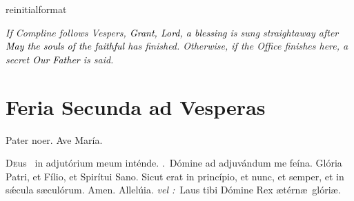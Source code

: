 \documentclass[12pt]{article} %
\newcommand{\myaboveinitial}[1]{%
    \expandafter\renewcommand\csname greinitialformat\endcsname[1]{%
        \fontsize{43}{43}\selectfont ##1
    }
    \gresetfirstlineaboveinitial{\textcolor{benred8}{\raisebox{6.0mm}{\small \textsc{\textbf{#1}}}}}{}
}
\newenvironment{rubric}{\vspace{2 mm}\color{benred8} \itshape \leftskip 0in \setlength{\parindent}{0.25in}}{\vspace{2 mm}}
\newenvironment{response}{\leftskip 0in \setlength{\parindent}{0in}}{\vspace{2 mm}}
\def\vel{\textit{\textcolor{benred8}{vel :}}}
\let\oldVbar\Vbar
\renewcommand{\Vbar}{\textcolor{benred8}{\oldVbar .}}
\let\oldRbar\Rbar
\renewcommand{\Rbar}{\textcolor{benred8}{\oldRbar .}}
\let\oldgrealtcross\grealtcross
\renewcommand{\grealtcross}{\textcolor{benred8}{\oldgrealtcross}}
\begin{document}
\begin{pages}
\begin{Rightside}
\pend\pstart


\myaboveinitial{\Vbar}

\pend\pstart

\begin{rubric}
If Compline follows Vespers, \emph{\textcolor{black}{Grant, Lord, a blessing}} is sung straightaway after \emph{\textcolor{black}{May the souls of the faithful}} has finished. Otherwise, if the Office finishes here, a secret \emph{\textcolor{black}{Our Father}} is said.

\end{rubric}


\pend\endnumbering
\end{Rightside}
\end{pages}
\Pages


















\newpage


\section*{Feria Secunda ad Vesperas}

\begin{center}Pater noer. Ave Mar\'{i}a.\end{center}

\thispagestyle{plain}

\begin{response}\lettrine{D}{e}us \grealtcross\ in adjut\'{o}rium meum int\'{e}nde. \Rbar\ D\'{o}mine ad adjuv\'{a}ndum me fe\'{i}na. Gl\'{o}ria Patri, et F\'{i}lio, et Spir\'{i}tui Sano. Sicut erat in princ\'{i}pio, et nunc, et semper, et in s\'{\ae}cula s\ae cul\'{o}rum. Amen. Allel\'{u}ia. \vel\ Laus tibi D\'{o}mine Rex \ae t\'{e}rn\ae\ gl\'{o}ri\ae .

\end{response}
\end{document}
